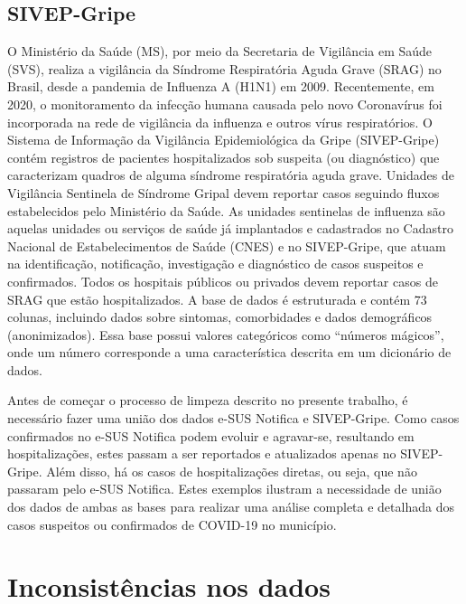 \subsection*{SIVEP-Gripe} 
O Ministério da Saúde (MS), por meio da Secretaria de Vigilância em Saúde (SVS), realiza a vigilância da Síndrome Respiratória Aguda Grave (SRAG) no Brasil, desde a pandemia de Influenza A (H1N1) em 2009. 
Recentemente, em 2020, o monitoramento da infecção humana causada pelo novo Coronavírus foi incorporada na rede de vigilância da influenza e outros vírus respiratórios. 
O Sistema de Informação da Vigilância Epidemiológica da Gripe (SIVEP-Gripe) contém registros de pacientes hospitalizados sob suspeita (ou diagnóstico) que caracterizam quadros de alguma síndrome respiratória aguda grave. 
Unidades de Vigilância Sentinela de Síndrome Gripal devem reportar casos seguindo fluxos estabelecidos pelo Ministério da Saúde.
As unidades sentinelas de influenza são aquelas unidades ou serviços de saúde já implantados e cadastrados no Cadastro Nacional de Estabelecimentos de Saúde (CNES) e no SIVEP-Gripe, que atuam na identificação, notificação, investigação e diagnóstico de casos suspeitos e confirmados. 
Todos os hospitais públicos ou privados devem reportar casos de SRAG que estão hospitalizados. 
A base de dados é estruturada e contém 73 colunas, incluindo dados sobre sintomas, comorbidades e dados demográficos (anonimizados). 
Essa base possui valores categóricos como ``números mágicos'', onde um número corresponde a uma característica descrita em um dicionário de dados.

Antes de começar o processo de limpeza descrito no presente trabalho, é necessário fazer uma união dos dados e-SUS Notifica e SIVEP-Gripe. 
Como casos confirmados no e-SUS Notifica podem evoluir e agravar-se, resultando em hospitalizações, estes passam a ser reportados e atualizados apenas no SIVEP-Gripe. 
Além disso, há os casos de hospitalizações diretas, ou seja, que não passaram pelo e-SUS Notifica. 
Estes exemplos ilustram a necessidade de união dos dados de ambas as bases para realizar uma análise completa e detalhada dos casos suspeitos ou confirmados de COVID-19 no município.

\section{Inconsistências nos dados} \label{subsec_incons_dados}

